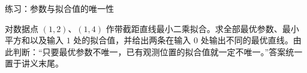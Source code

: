 \documentclass[aspectratio=169,10pt,fontset=fandol]{ctexbeamer}
\begin{document}
\begin{frame}[t,fragile]{练习：参数与拟合值的唯一性}
\normalsize
{\normalsize
\begin{exercise}
\label{mathagent:exercise:2a86525c0362bd6004ffb20b570bb82a80598d07bb305d4bd130c7cd7cc87533}
对数据点 $(1,2)$、$(1,4)$ 作带截距直线最小二乘拟合。求全部最优参数、最小平方和以及输入 $1$ 处的拟合值，并给出两条在输入 $0$ 处输出不同的最优直线。由此判断：“只要最优参数不唯一，已有观测位置的拟合值就一定不唯一。”答案统一置于讲义末尾。
\end{exercise}
}
\end{frame}
\end{document}
